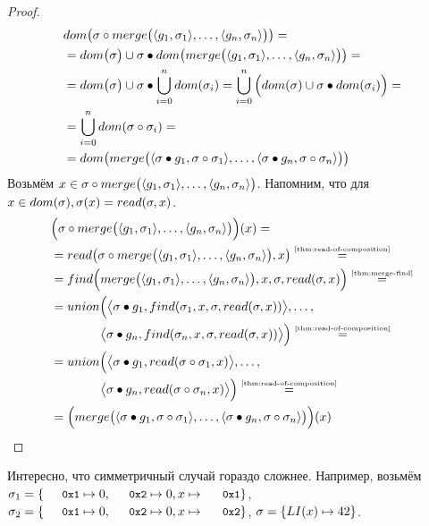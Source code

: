 \begin{proof}
\begin{align*}
&dom\big(\sigma\circ merge\big(\langle g_1, \sigma_1\rangle,\ldots,\langle g_n, \sigma_n\rangle\big)\big)=\\
&=dom\big(\sigma\big)\cup\sigma\bullet dom\big(merge\big(\langle g_1, \sigma_1\rangle,\ldots,\langle g_n, \sigma_n\rangle\big)\big)=\\
&=dom\big(\sigma\big)\cup\sigma\bullet\bigcup_{i=0}^{n}{dom(\sigma_i)}=\bigcup_{i=0}^{n}\Big(dom(\sigma)\cup\sigma\bullet dom(\sigma_i)\Big)=\\
&=\bigcup_{i=0}^{n}{dom(\sigma\circ\sigma_i)}=\\
&=dom\big(merge\big(\langle\sigma\bullet g_1, \sigma\circ\sigma_1\rangle,\ldots,\langle\sigma\bullet g_n, \sigma\circ\sigma_n\rangle\big)\big)
\end{align*}
Возьмём $x\in\sigma\circ merge\big(\langle g_1, \sigma_1\rangle,\ldots,\langle g_n, \sigma_n\rangle\big)$. Напомним, что для $x\in dom(\sigma), \sigma(x)=read(\sigma,x)$.
\begin{align*}
&\Big(\compose{\sigma}{\Merge{\pair{g_1}{\sigma_1},\ldots,\pair{g_n}{\sigma_n}}}\Big)(x)=\\
&=\Deref{\compose{\sigma}{\Merge{\pair{g_1}{\sigma_1},\ldots,\pair{g_n}{\sigma_n}}}}{x}\eqby{\autoref{thm:read-of-composition}}\\
&=\Find{\Merge{\pair{g_1}{\sigma_1},\ldots,\pair{g_n}{\sigma_n}}}{x}{\sigma}{\deref{\sigma}{x}}\eqby{\autoref{thm:merge-find}}\\
&=\Union{\paiR{\fillterm{\sigma}{g_1}}{\find{\sigma_1}{x}{\sigma}{\deref{\sigma}{x}}},\ldots,\\
&\qquad\qquad\paiR{\fillterm{\sigma}{g_n}}{\find{\sigma_n}{x}{\sigma}{\deref{\sigma}{x}}}}\eqby{\autoref{thm:read-of-composition}}\\
&=\Union{\paiR{\fillterm{\sigma}{g_1}}{\deref{\compose{\sigma}{\sigma_1}}{x}},\ldots,\\
&\qquad\qquad\paiR{\fillterm{\sigma}{g_n}}{\deref{\compose{\sigma}{\sigma_n}}{x}}}\eqby{\autoref{thm:read-of-composition}}\\
&=\Big(\Merge{\pair{\fillterm{\sigma}{g_1}}{\compose{\sigma}{\sigma_1}},\ldots,\pair{\fillterm{\sigma}{g_n}}{\compose{\sigma}{\sigma_n}}}\Big)(x)
\end{align*}
\end{proof}
Интересно, что симметричный случай гораздо сложнее. Например, возьмём
\mbox{$\sigma_1=\{ \addr{0x1} \mapsto 0, \addr{0x2} \mapsto 0, x \mapsto \addr{0x1}\}$}, \mbox{$\sigma_2=\{ \addr{0x1} \mapsto 0, \addr{0x2} \mapsto 0, x \mapsto \addr{0x2}\}$}, \mbox{$\sigma=\{LI(x) \mapsto 42 \}$}.
